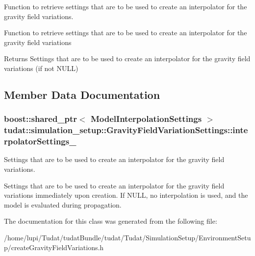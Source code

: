 Function to retrieve settings that are to be used to create an interpolator for the gravity field variations. 

Function to retrieve settings that are to be used to create an interpolator for the gravity field variations

\begin{DoxyReturn}{Returns}
Settings that are to be used to create an interpolator for the gravity field variations (if not N\+U\+LL) 
\end{DoxyReturn}


\subsection{Member Data Documentation}
\subsubsection[{\texorpdfstring{interpolator\+Settings\+\_\+}{interpolatorSettings_}}]{\setlength{\rightskip}{0pt plus 5cm}boost\+::shared\+\_\+ptr$<$ {\bf Model\+Interpolation\+Settings} $>$ tudat\+::simulation\+\_\+setup\+::\+Gravity\+Field\+Variation\+Settings\+::interpolator\+Settings\+\_\+\hspace{0.3cm}{\ttfamily [protected]}}\hypertarget{classtudat_1_1simulation__setup_1_1GravityFieldVariationSettings_adbe509504009ea40cc9d664894ec29ec}{}\label{classtudat_1_1simulation__setup_1_1GravityFieldVariationSettings_adbe509504009ea40cc9d664894ec29ec}


Settings that are to be used to create an interpolator for the gravity field variations. 

Settings that are to be used to create an interpolator for the gravity field variations immediately upon creation. If N\+U\+LL, no interpolation is used, and the model is evaluated during propagation. 

The documentation for this class was generated from the following file\+:\begin{DoxyCompactItemize}
\item 
/home/lupi/\+Tudat/tudat\+Bundle/tudat/\+Tudat/\+Simulation\+Setup/\+Environment\+Setup/create\+Gravity\+Field\+Variations.\+h\end{DoxyCompactItemize}

